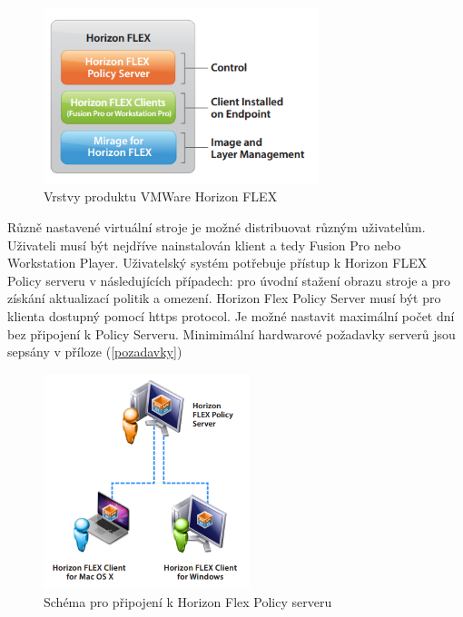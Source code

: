  \begin{figure}[h!]\label{FlexVrstvy}
 \centering
\includegraphics[width=8cm]{img/FlexVrstvy}
\caption{Vrstvy produktu VMWare Horizon FLEX} 
\label{FlexVrstvy}
\end{figure}



Různě nastavené virtuální stroje je možné distribuovat různým uživatelům. Uživateli musí být nejdříve nainstalován klient a tedy Fusion Pro nebo Workstation Player. Uživatelský systém potřebuje přístup k Horizon FLEX Policy serveru v následujících případech: pro úvodní stažení obrazu stroje a pro získání aktualizací politik a omezení. Horizon Flex Policy Server musí být pro klienta dostupný pomocí https protocol. Je možné nastavit maximální počet dní bez připojení k Policy Serveru. Minimimální hardwarové požadavky serverů jsou sepsány v příloze (\ref{pozadavky})


 \begin{figure}[h!]\label{FlexPolicy}
 \centering
\includegraphics[width=6cm]{img/FlexPolicy}
\caption{Schéma pro připojení k Horizon Flex Policy serveru}
\end{figure} 


